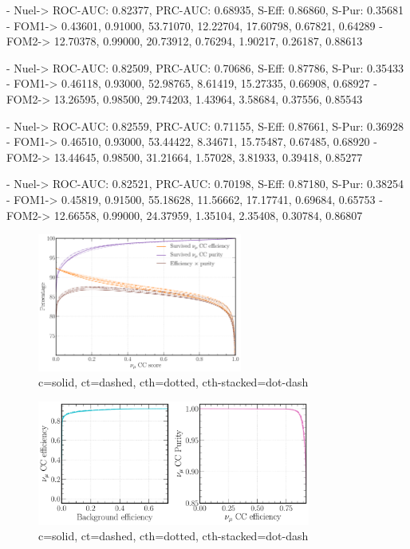 - Nuel-> ROC-AUC: 0.82377, PRC-AUC: 0.68935, S-Eff: 0.86860, S-Pur: 0.35681
- FOM1-> 0.43601, 0.91000, 53.71070, 12.22704, 17.60798, 0.67821, 0.64289
- FOM2-> 12.70378, 0.99000, 20.73912, 0.76294, 1.90217, 0.26187, 0.88613

- Nuel-> ROC-AUC: 0.82509, PRC-AUC: 0.70686, S-Eff: 0.87786, S-Pur: 0.35433
- FOM1-> 0.46118, 0.93000, 52.98765, 8.61419, 15.27335, 0.66908, 0.68927
- FOM2-> 13.26595, 0.98500, 29.74203, 1.43964, 3.58684, 0.37556, 0.85543

- Nuel-> ROC-AUC: 0.82559, PRC-AUC: 0.71155, S-Eff: 0.87661, S-Pur: 0.36928
- FOM1-> 0.46510, 0.93000, 53.44422, 8.34671, 15.75487, 0.67485, 0.68920
- FOM2-> 13.44645, 0.98500, 31.21664, 1.57028, 3.81933, 0.39418, 0.85277

- Nuel-> ROC-AUC: 0.82521, PRC-AUC: 0.70198, S-Eff: 0.87180, S-Pur: 0.38254
- FOM1-> 0.45819, 0.91500, 55.18628, 11.56662, 17.17741, 0.69684, 0.65753
- FOM2-> 12.66558, 0.99000, 24.37959, 1.35104, 2.35408, 0.30784, 0.86807

\begin{figure} %
    \includegraphics[width=0.6\textwidth]{diagrams/7-cvn/chipsnet/channel_numu_eff_curves.pdf}
    \caption[channel numu eff curves short]
    {c=solid, ct=dashed, cth=dotted, cth-stacked=dot-dash}
    \label{fig:channel_numu_eff_curves}
\end{figure}

\begin{figure} %
    \includegraphics[width=0.8\textwidth]{diagrams/7-cvn/chipsnet/channel_numu_comp_curves.pdf}
    \caption[channel numu comp curves short]
    {c=solid, ct=dashed, cth=dotted, cth-stacked=dot-dash}
    \label{fig:channel_numu_comp_curves}
\end{figure}

